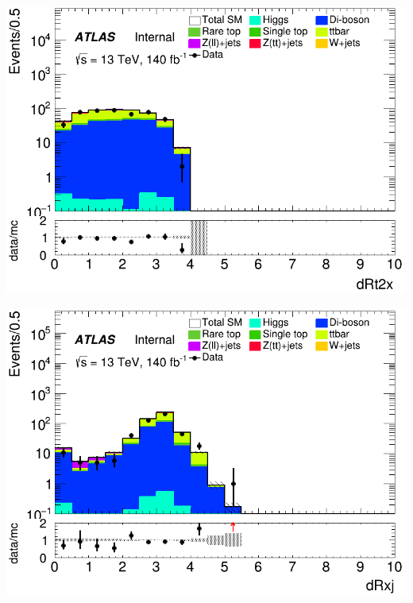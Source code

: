 \documentclass[usenames,dvipsnames]{beamer}
\begin{document}
\begin{frame}
    \begin{minipage}{0.32\textwidth}
        \centering
        \includegraphics[width=\textwidth]{graphics/LLH_met/LLH_met_dRt2x.png}
    \end{minipage}
    \hfill
    \begin{minipage}{0.32\textwidth}
        \centering
        \includegraphics[width=\textwidth]{graphics/LLH_met/LLH_met_dRxj.png}
    \end{minipage}
    \hfill
    \begin{minipage}{0.32\textwidth}
        \centering

\end{minipage}
\end{frame}
\end{document}
